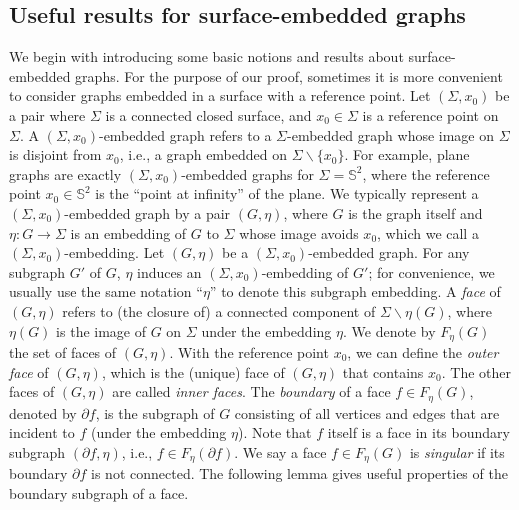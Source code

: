 \documentclass[a4paper,11pt]{article}
\numberwithin{lemma}{section}
\begin{document}
\main*

\subsection{Useful results for surface-embedded graphs}
We begin with introducing some basic notions and results about surface-embedded graphs.
For the purpose of our proof, sometimes it is more convenient to consider graphs embedded in a surface with a reference point.
Let $(\varSigma,x_0)$ be a pair where $\varSigma$ is a connected closed surface, and $x_0 \in \varSigma$ is a reference point on $\varSigma$.
A $(\varSigma,x_0)$-embedded graph refers to a $\varSigma$-embedded graph whose image on $\varSigma$ is disjoint from $x_0$, i.e., a graph embedded on $\varSigma \backslash \{x_0\}$.
For example, plane graphs are exactly $(\varSigma,x_0)$-embedded graphs for $\varSigma = \mathbb{S}^2$, where the reference point $x_0 \in \mathbb{S}^2$ is the ``point at infinity'' of the plane.
We typically represent a $(\varSigma,x_0)$-embedded graph by a pair $(G,\eta)$, where $G$ is the graph itself and $\eta\colon G \rightarrow \varSigma$ is an embedding of $G$ to $\varSigma$ whose image avoids $x_0$, which we call a $(\varSigma,x_0)$-embedding.
Let $(G,\eta)$ be a $(\varSigma,x_0)$-embedded graph.
For any subgraph $G'$ of $G$, $\eta$ induces an $(\varSigma,x_0)$-embedding of $G'$; for convenience, we usually use the same notation ``$\eta$'' to denote this subgraph embedding.
A \emph{face} of $(G,\eta)$ refers to (the closure of) a connected component of $\varSigma \backslash \eta(G)$, where $\eta(G)$ is the image of $G$ on $\varSigma$ under the embedding $\eta$.
We denote by $F_\eta(G)$ the set of faces of $(G,\eta)$.
With the reference point $x_0$, we can define the \emph{outer face} of $(G,\eta)$, which is the (unique) face of $(G,\eta)$ that contains $x_0$.
The other faces of $(G,\eta)$ are called \emph{inner faces}.
The \emph{boundary} of a face $f \in F_\eta(G)$, denoted by $\partial f$, is the subgraph of $G$ consisting of all vertices and edges that are incident to $f$ (under the embedding $\eta$).
Note that $f$ itself is a face in its boundary subgraph $(\partial f, \eta)$, i.e., $f \in F_\eta(\partial f)$.
We say a face $f \in F_\eta(G)$ is \emph{singular} if its boundary $\partial f$ is not connected.
The following lemma gives useful properties of the boundary subgraph of a face.
\end{document}
